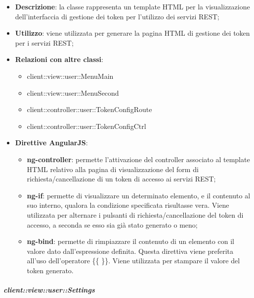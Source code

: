 			\begin{itemize}
				\item \textbf{Descrizione}: la classe rappresenta un template HTML per la visualizzazione dell'interfaccia di gestione dei token per l'utilizzo dei servizi REST;
				\item \textbf{Utilizzo}: viene utilizzata per generare la pagina HTML di gestione dei token per i servizi REST;
				\item \textbf{Relazioni con altre classi}:
					\begin{itemize}
						\item client::view::user::MenuMain
						\item client::view::user::MenuSecond
						\item client::controller::user::TokenConfigRoute
						\item client::controller::user::TokenConfigCtrl
					\end{itemize}
				\item \textbf{Direttive AngularJS}:
					\begin{itemize}
						\item \textbf{ng-controller}: permette l'attivazione del controller associato al template HTML relativo alla pagina di visualizzazione del form di richiesta/cancellazione di un token di accesso ai servizi REST;
						\item \textbf{ng-if}: permette di visualizzare un determinato elemento, e il contenuto al suo interno, qualora la condizione specificata risultasse vera. Viene utilizzata per alternare i pulsanti di richiesta/cancellazione del token di accesso, a seconda se esso sia già stato generato o meno;
						\item \textbf{ng-bind}: permette di rimpiazzare il contenuto di un elemento con il valore dato dall'espressione definita. Questa direttiva viene preferita all'uso dell'operatore \{\{ \}\}. Viene utilizzata per stampare il valore del token generato.
					\end{itemize}
			\end{itemize}

		\subparagraph{client::view::user::Settings} %
		\label{subp:bdsm_app_client_view_user_settings}

